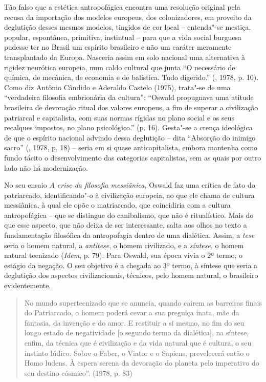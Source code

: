Tão falso que a estética antropofágica encontra uma resolução original
pela recusa da importação dos modelos europeus, dos colonizadores, em
proveito da deglutição desses mesmos modelos, tingidos de cor local --
entenda"-se mestiça, popular, espontânea, primitiva, instintual -- para
que a vida social burguesa pudesse ter no Brasil um espírito brasileiro
e não um caráter meramente transplantado da Europa. Nasceria assim em
solo nacional uma alternativa à rigidez neurótica europeia, num caldo
cultural que junta ``O necessário de química, de mecânica, de economia e
de balística. Tudo digerido.'' (, 1978, p. 10). Como diz Antônio
Cândido e Aderaldo Castelo (1975), trata"-se de uma ``verdadeira
filosofia embrionária da cultura'': ``Oswald propugnava uma atitude
brasileira de devoração ritual dos valores europeus, a fim de superar a
civilização patriarcal e capitalista, com suas normas rígidas no plano
social e os seus recalques impostos, no plano psicológico.'' (p. 16).
Gesta"-se a crença ideológica de que o espírito nacional advindo dessa
deglutição -- dita ``Absorção do inimigo sacro'' (, 1978, p. 18)
-- seria em si quase anticapitalista, embora mantenha como fundo tácito
o desenvolvimento das categorias capitalistas, sem as quais por outro
lado não há modernização.

No seu ensaio \emph{A crise da filosofia messiânica,} Oswald faz uma
crítica de fato do patriarcado, identificando"-o à civilização europeia,
ao que ele chama de cultura messiânica, à qual ele opõe o matriarcado,
que coincidiria com a cultura antropofágica -- que se distingue do
canibalismo, que não é ritualístico. Mais do que esse aspecto, que não
deixa de ser interessante, salta aos olhos no texto a fundamentação
filosófica da antropofagia dentro de uma dialética. Assim, a \emph{tese}
seria o homem natural, a \emph{antítese}, o homem civilizado, e a
\emph{síntese}, o homem natural tecnizado (\emph{Idem}, p. 79). Para
Oswald, sua época vivia o 2º termo, o estágio da negação. O seu objetivo
é a chegada ao 3º termo, à síntese que seria a deglutição dos aspectos
civilizacionais, técnicos, pelo homem natural, o brasileiro
evidentemente.

\begin{quote}
No mundo supertecnizado que se anuncia, quando caírem as barreiras
finais do Patriarcado, o homem poderá cevar a sua preguiça inata, mãe da
fantasia, da invenção e do amor. E restituir a si mesmo, no fim do seu
longo estado de negatividade [o segundo termo da dialética], na
síntese, enfim, da técnica que é civilização e da vida natural que é
cultura, o seu instinto lúdico. Sobre o Faber, o Viator e o Sapiens,
prevelecerá então o Homo ludens. À espera serena da devoração do planeta
pelo imperativo do seu destino cósmico''. (1978, p. 83)
\end{quote}

